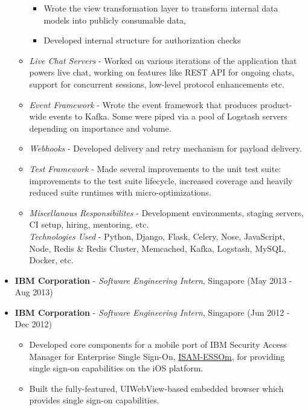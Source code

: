 \begin{itemize}
\begin{itemize}
    \begin{itemize}
    \tightlist
    \item
      Wrote the view transformation layer to transform internal data
      models into publicly consumable data,
    \item
      Developed internal structure for authorization checks
    \end{itemize}
  \item
    \emph{Live Chat Servers} - Worked on various iterations of the
    application that powers live chat, working on features like REST API
    for ongoing chats, support for concurrent sessions, low-level
    protocol enhancements etc.
  \item
    \emph{Event Framework} - Wrote the event framework that produces
    product-wide events to Kafka. Some were piped via a pool of Logstash
    servers depending on importance and volume.
  \item
    \emph{Webhooks} - Developed delivery and retry mechanism for payload
    delivery.
  \item
    \emph{Test Framework} - Made several improvements to the unit test
    suite: improvements to the test suite lifecycle, increased coverage
    and heavily reduced suite runtimes with micro-optimizations.
  \item
    \emph{Miscellanous Responsibilites} - Development environments,
    staging servers, CI setup, hiring, mentoring, etc.\\
    \emph{Technologies Used} - Python, Django, Flask, Celery, Nose,
    JavaScript, Node, Redis \& Redis Cluster, Memcached, Kafka,
    Logstash, MySQL, Docker, etc.
  \end{itemize}
\item
  \textbf{IBM Corporation} - \emph{Software Engineering Intern},
  Singapore \hfill (May 2013 - Aug 2013)
\item
  \textbf{IBM Corporation} - \emph{Software Engineering Intern},
  Singapore \hfill (Jun 2012 - Dec 2012)

  \begin{itemize}
  \tightlist
  \item
    Developed core components for a mobile port of IBM Security Access
    Manager for Enterprise Single Sign-On,
    \href{https://itunes.apple.com/us/app/isam-essom/id741972716?mt=8}{ISAM-ESSOm},
    for providing single sign-on capabilities on the iOS platform.
  \item
    Built the fully-featured, UIWebView-based embedded browser which
    provides single sign-on capabilities.
  \end{itemize}
\end{itemize}

